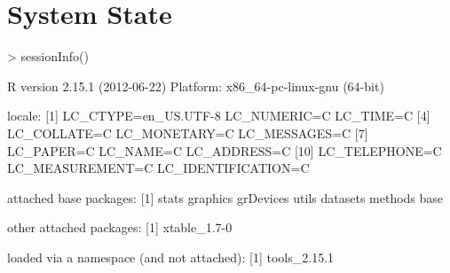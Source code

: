 \documentclass[a4paper]{article}
\begin{document}
\section{System State}
\begin{Schunk}
\begin{Sinput}
> sessionInfo()
\end{Sinput}
\begin{Soutput}
R version 2.15.1 (2012-06-22)
Platform: x86_64-pc-linux-gnu (64-bit)

locale:
 [1] LC_CTYPE=en_US.UTF-8 LC_NUMERIC=C         LC_TIME=C           
 [4] LC_COLLATE=C         LC_MONETARY=C        LC_MESSAGES=C       
 [7] LC_PAPER=C           LC_NAME=C            LC_ADDRESS=C        
[10] LC_TELEPHONE=C       LC_MEASUREMENT=C     LC_IDENTIFICATION=C 

attached base packages:
[1] stats     graphics  grDevices utils     datasets  methods   base     

other attached packages:
[1] xtable_1.7-0

loaded via a namespace (and not attached):
[1] tools_2.15.1
\end{Soutput}
\end{Schunk}
\end{document}
